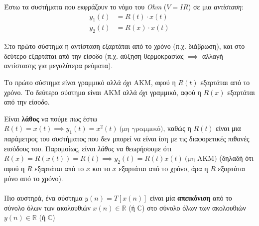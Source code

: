 \documentclass[11pt,a4paper,notitlepage,fleqn]{article}
\begin{document}
Έστω τα συστήματα που εκφράζουν το νόμο του \emph{Ohm} (\( V=IR \)) σε μια \emph{αντίσταση}:
\begin{align*}
	y_1(t) &= R(t) \cdot x(t)\\
	y_2(t) &= R(x) \cdot x(t)
\end{align*}

Στο πρώτο σύστημα η αντίσταση εξαρτάται από το χρόνο (π.χ. διάβρωση), και στο δεύτερο εξαρτάται από την είσοδο (π.χ. αύξηση θερμοκρασίας \( \implies \) αλλαγή αντίστασης για μεγαλύτερα ρεύματα).

Το πρώτο σύστημα είναι γραμμικό αλλά \emph{όχι} ΑΚΜ, αφού η \( R(t) \) εξαρτάται από το χρόνο.
Το δεύτερο σύστημα είναι ΑΚΜ αλλά \emph{όχι} γραμμικό, αφού η \( R(x) \) εξαρτάται από την είσοδο.

Είναι \textbf{λάθος} να πούμε πως έστω \( R(t)=x(t) \implies y_1(t)=x^2(t)\ \text{(μη γραμμικό)} \), καθώς
η \( R(t) \) είναι μια παράμετρος του συστήματος που δεν μπορεί να είναι ίση με τις διαφορετικές πιθανές
εισόδους του. Παρομοίως, είναι \emph{λάθος} να θεωρήσουμε ότι \( R(x) = R(x(t)) = R(t) \implies y_2(t) = R(t)x(t) \ \text{(μη ΑΚΜ)} \) (δηλαδή ότι αφού η \( R \) εξαρτάται από το \( x \) και το \( x \) εξαρτάται από το χρόνο, άρα η \( R \) εξαρτάται μόνο από το χρόνο).


\paragraph{}
Πιο αυστηρά, ένα σύστημα \( y(n) = T\left[x(n)\right] \) είναι μία \textbf{απεικόνιση}
από το σύνολο όλων των ακολουθιών \( x(n) \in \mathbb R \) (ή \( \mathbb C \))
στο σύνολο όλων των ακολουθιών \( y(n) \in \mathbb R  \) (ή \( \mathbb{C} \))
\end{document}
